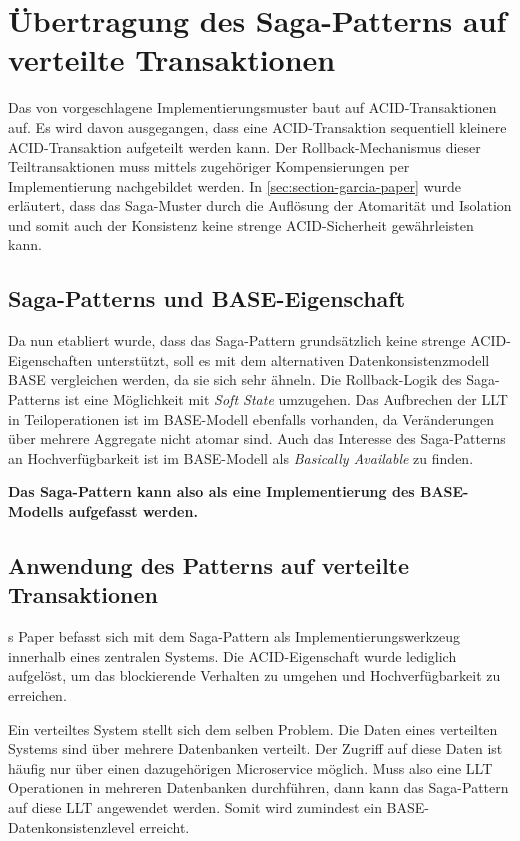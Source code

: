 \section{Übertragung des Saga-Patterns auf verteilte Transaktionen}

Das von \citeauthor{GarciaMolina.1987} vorgeschlagene Implementierungsmuster baut auf ACID-Transaktionen auf. Es wird davon ausgegangen, dass eine ACID-Transaktion sequentiell kleinere ACID-Transaktion aufgeteilt werden kann. Der Rollback-Mechanismus dieser Teiltransaktionen muss mittels zugehöriger Kompensierungen per Implementierung nachgebildet werden. In \cref{sec:section-garcia-paper} wurde erläutert, dass das Saga-Muster durch die Auflösung der Atomarität und Isolation und somit auch der Konsistenz keine strenge ACID-Sicherheit gewährleisten kann. 

\subsection{Saga-Patterns und BASE-Eigenschaft}
Da nun etabliert wurde, dass das Saga-Pattern grundsätzlich keine strenge ACID-Eigenschaften unterstützt, soll es mit dem alternativen Datenkonsistenzmodell BASE vergleichen werden, da sie sich sehr ähneln. Die Rollback-Logik des Saga-Patterns ist eine Möglichkeit mit \textit{Soft State} umzugehen. Das Aufbrechen der LLT in Teiloperationen ist im BASE-Modell ebenfalls vorhanden, da Veränderungen über mehrere Aggregate nicht atomar sind. Auch das Interesse des Saga-Patterns an Hochverfügbarkeit ist im BASE-Modell als \textit{Basically Available} zu finden. 

\textbf{Das Saga-Pattern kann also als eine Implementierung des BASE-Modells aufgefasst werden.}

\subsection{Anwendung des Patterns auf verteilte Transaktionen}
\citeauthor{GarciaMolina.1987}s Paper  befasst sich mit dem Saga-Pattern als Implementierungswerkzeug innerhalb eines zentralen Systems. Die ACID-Eigenschaft wurde lediglich aufgelöst, um das blockierende Verhalten zu umgehen und Hochverfügbarkeit zu erreichen.\cite{GarciaMolina.1987} 

Ein verteiltes System stellt sich dem selben Problem. Die Daten eines verteilten Systems sind über mehrere Datenbanken verteilt. Der Zugriff auf diese Daten ist häufig nur über einen dazugehörigen Microservice möglich. Muss also eine LLT Operationen in mehreren Datenbanken durchführen, dann kann das Saga-Pattern auf diese LLT angewendet werden. Somit wird zumindest ein BASE-Datenkonsistenzlevel erreicht. 

